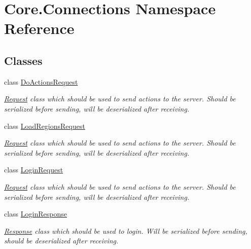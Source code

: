 \hypertarget{namespaceCore_1_1Connections}{}\section{Core.\+Connections Namespace Reference}
\label{namespaceCore_1_1Connections}
\subsection*{Classes}
\begin{DoxyCompactItemize}
\item 
class \hyperlink{classCore_1_1Connections_1_1DoActionsRequest}{Do\+Actions\+Request}
\begin{DoxyCompactList}\small\item\em \hyperlink{classCore_1_1Connections_1_1Request}{Request} class which should be used to send actions to the server. Should be serialized before sending, will be deserialized after receiving. \end{DoxyCompactList}\item 
class \hyperlink{classCore_1_1Connections_1_1LoadRegionsRequest}{Load\+Regions\+Request}
\begin{DoxyCompactList}\small\item\em \hyperlink{classCore_1_1Connections_1_1Request}{Request} class which should be used to send actions to the server. Should be serialized before sending, will be deserialized after receiving. \end{DoxyCompactList}\item 
class \hyperlink{classCore_1_1Connections_1_1LoginRequest}{Login\+Request}
\begin{DoxyCompactList}\small\item\em \hyperlink{classCore_1_1Connections_1_1Request}{Request} class which should be used to send actions to the server. Should be serialized before sending, will be deserialized after receiving. \end{DoxyCompactList}\item 
class \hyperlink{classCore_1_1Connections_1_1LoginResponse}{Login\+Response}
\begin{DoxyCompactList}\small\item\em \hyperlink{classCore_1_1Connections_1_1Response}{Response} class which should be used to login. Will be serialized before sending, should be deserialized after receiving. \end{DoxyCompactList}\item 

\end{DoxyCompactItemize}
